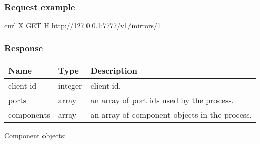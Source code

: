 \documentclass[a4paper,11pt,openany,oneside,english]{sphinxmanual}
\begin{document}
\subsubsection{Request example}
\label{\detokenize{api_ref/spp_mirror:request-example}}
\begin{sphinxVerbatim}[commandchars=\\\{\},formatcom=\footnotesize]
 curl \PYGZhy{}X GET \PYGZhy{}H  
  http://127.0.0.1:7777/v1/mirrors/1
\end{sphinxVerbatim}


\subsubsection{Response}
\label{\detokenize{api_ref/spp_mirror:response}}

\begin{savenotes}\sphinxattablestart
\centering
{}
\sphinxthecaptionisattop
{}\label{\detokenize{api_ref/spp_mirror:id15}}\label{\detokenize{api_ref/spp_mirror:table-spp-ctl-spp-mirror-res}}
\sphinxaftertopcaption
\begin{tabulary}{\linewidth}[t]{|T|T|T|}
\hline
\sphinxstyletheadfamily 
Name
&\sphinxstyletheadfamily 
Type
&\sphinxstyletheadfamily 
Description
\\
\hline
client-id
&
integer
&
client id.
\\
\hline
ports
&
array
&
an array of port ids used by the process.
\\
\hline
components
&
array
&
an array of component objects in the process.
\\
\hline
\end{tabulary}
\par
\sphinxattableend\end{savenotes}

Component objects:
\end{document}
